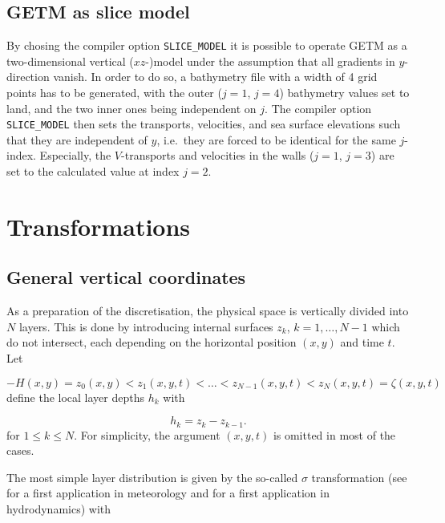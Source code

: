 \subsection{GETM as slice model}\label{Section_GETM_Slice}

By chosing the compiler option {\tt SLICE\_MODEL} it is possible to
operate GETM as a two-dimensional vertical ($xz$-)model under the assumption
that all gradients in $y$-direction vanish. In order to do so,
a bathymetry file with a width of 4 grid points has to be generated,
with the outer ($j=1$, $j=4$) bathymetry values set to land, and the two inner
ones being independent on $j$. The compiler option {\tt SLICE\_MODEL}
then sets the transports, velocities, and sea surface elevations such that
they are independent of $y$, i.e.\ they are forced to be identical for
the same $j$-index. Especially, the $V$-transports and velocities 
in the walls ($j=1$, $j=3$) are set to the calculated value at index
$j=2$.

\section{Transformations}\label{SectionTransformations} 

\subsection{General vertical coordinates}\label{SectionGeneralCoordinates}  

As a preparation of the discretisation, the physical space
is vertically divided into $N$ layers. This is done by introducing
internal surfaces $z_k$, $k=1,\dots,N-1$
which do not intersect,
each depending on the horizontal position $(x,y)$ and time $t$.
Let

\begin{equation}\label{gamma_def}
-H(x,y)=z_0(x,y)<z_1(x,y,t)<\dots<z_{N-1}(x,y,t)<z_N(x,y,t)=\zeta(x,y,t)
\end{equation}
define the local layer depths $h_k$ with

\begin{equation}\label{hkdef}
h_k=z_k-z_{k-1}.
\end{equation}
for $1\leq k\leq N$. For simplicity, the argument $(x,y,t)$ is omitted in
most of the cases.

The most simple layer distribution is given by the so-called $\sigma$
\label{sigmacoord} transformation 
(see \cite{PHILLIPS57} for a first application
in meteorology and \cite{FREEMANea72} for a first application
in hydrodynamics) with

